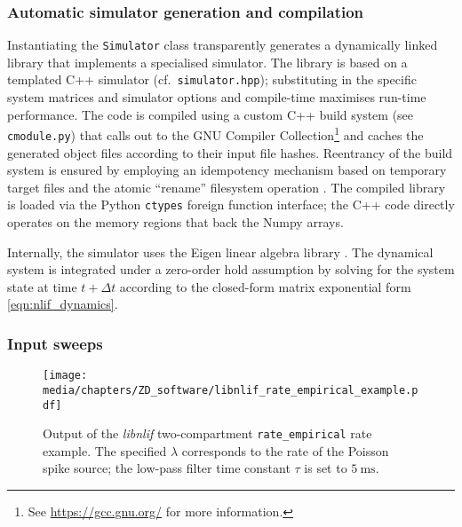 \subsubsection{Automatic simulator generation and compilation}
Instantiating the \texttt{Simulator} class transparently generates a dynamically linked library that implements a specialised simulator.
The library is based on a templated \citep[Chapter~23]{stroustrup2013programming} C++ simulator (cf.~\texttt{simulator.hpp});
substituting in the specific system matrices and simulator options and compile-time maximises run-time performance.
The code is compiled using a custom C++ build system (see \texttt{cmodule.py}) that calls out to the GNU Compiler Collection\footnote{See \url{https://gcc.gnu.org/} for more information.} and caches the generated object files according to their input file hashes.
Reentrancy of the build system is ensured by employing an idempotency mechanism based on temporary target files and the atomic \enquote{rename} filesystem operation \citep[pp.~1816-1820]{2018ieee}.
The compiled library is loaded via the Python \texttt{ctypes} foreign function interface; the C++ code directly operates on the memory regions that back the Numpy arrays.


Internally, the simulator uses the Eigen linear algebra library \citep{eigenweb}.
The dynamical system is integrated under a zero-order hold assumption by solving for the system state at time $t + \Delta t$ according to the closed-form matrix exponential form \cref{eqn:nlif_dynamics}.

\subsubsection{Input sweeps}

\begin{figure}
	\centering
	\texttt{[image: media/chapters/ZD\_software/libnlif\_rate\_empirical\_example.pdf]}
	\caption[Output of the \emph{libnlif} \enquote{rate\_empirical} function for different noise parameters]{Output of the \emph{libnlif} two-compartment \LIF \texttt{rate\_empirical} rate example. The specified $\lambda$ corresponds to the rate of the Poisson spike source; the low-pass filter time constant $\tau$ is set to $\SI{5}{\milli\second}$.}
	\label{fig:libnlif_rate_empirical_example}
\end{figure}

